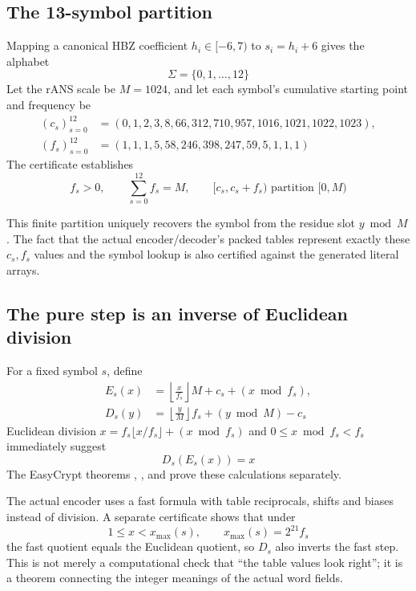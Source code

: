 \subsection{The 13-symbol partition}

Mapping a canonical HBZ coefficient \(h_i\in[-6,7)\) to
\(s_i=h_i+6\) gives the alphabet
\[
  \Sigma=\{0,1,\ldots,12\}
\]
Let the rANS scale be \(M=1024\), and let each symbol's cumulative starting
point and frequency be
\[
\begin{aligned}
(c_s)_{s=0}^{12}
  &=(0,1,2,3,8,66,312,710,957,1016,1021,1022,1023),\\
(f_s)_{s=0}^{12}
  &=(1,1,1,5,58,246,398,247,59,5,1,1,1)
\end{aligned}
\]
The certificate establishes
\[
  f_s>0,\qquad \sum_{s=0}^{12}f_s=M,\qquad
  [c_s,c_s+f_s)\text{ partition }[0,M)\text{}
\]

This finite partition uniquely recovers the symbol from the residue slot
\(y\bmod M\). The fact that the actual encoder/decoder's packed tables represent
exactly these \(c_s,f_s\) values and the symbol lookup is also certified against
the generated literal arrays.

\subsection{The pure step is an inverse of Euclidean division}

For a fixed symbol \(s\), define
\begin{align*}
  E_s(x)
    &=\left\lfloor\frac{x}{f_s}\right\rfloor M
      +c_s+(x\bmod f_s),\\
  D_s(y)
    &=\left\lfloor\frac{y}{M}\right\rfloor f_s
      +(y\bmod M)-c_s
\end{align*}
Euclidean division
\(x=f_s\lfloor x/f_s\rfloor+(x\bmod f_s)\) and
\(0\le x\bmod f_s<f_s\) immediately suggest
\[
  D_s(E_s(x))=x
\]
The EasyCrypt theorems
,
, and
 prove these calculations separately.

The actual encoder uses a fast formula with table reciprocals, shifts and biases
instead of division. A separate certificate shows that under
\[
  1\le x<x_{\max}(s),\qquad
  x_{\max}(s)=2^{21}f_s
\]
the fast quotient equals the Euclidean quotient, so \(D_s\) also inverts the
fast step. This is not merely a computational check that ``the table values look
right''; it is a theorem connecting the integer meanings of the actual word fields.

